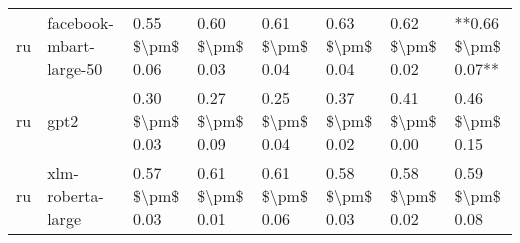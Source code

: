 \begin{tabular}{llllllll}
      ru &            facebook-mbart-large-50 & 0.55 \$\textbackslash pm\$ 0.06 &           0.60 \$\textbackslash pm\$ 0.03 &       0.61 \$\textbackslash pm\$ 0.04 &        0.63 \$\textbackslash pm\$ 0.04 &                         0.62 \$\textbackslash pm\$ 0.02 & **0.66 \$\textbackslash pm\$ 0.07** \\
      ru &                               gpt2 & 0.30 \$\textbackslash pm\$ 0.03 &           0.27 \$\textbackslash pm\$ 0.09 &       0.25 \$\textbackslash pm\$ 0.04 &        0.37 \$\textbackslash pm\$ 0.02 &                         0.41 \$\textbackslash pm\$ 0.00 &     0.46 \$\textbackslash pm\$ 0.15 \\
      ru &                  xlm-roberta-large & 0.57 \$\textbackslash pm\$ 0.03 &           0.61 \$\textbackslash pm\$ 0.01 &       0.61 \$\textbackslash pm\$ 0.06 &        0.58 \$\textbackslash pm\$ 0.03 &                         0.58 \$\textbackslash pm\$ 0.02 &     0.59 \$\textbackslash pm\$ 0.08 \\
\bottomrule
\end{tabular}
